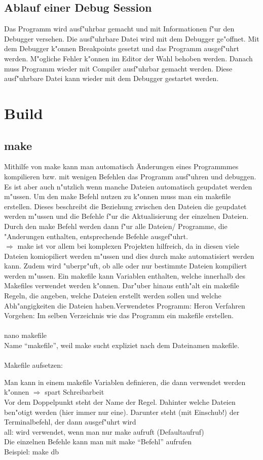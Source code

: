 \documentclass[a4paper,11pt,titlepage]{article}
\begin{document}
\subsection{Ablauf einer Debug Session}
Das Programm wird ausf"uhrbar gemacht und mit Informationen f"ur den Debugger versehen. Die ausf"uhrbare Datei wird mit dem Debugger ge"offnet. Mit dem Debugger k"onnen Breakpoints gesetzt und das Programm ausgef"uhrt werden. M"ogliche Fehler k"onnen im Editor der Wahl behoben werden. Danach muss Programm wieder mit Compiler ausf"uhrbar gemacht werden. Diese ausf"uhrbare Datei kann wieder mit dem Debugger gestartet werden.

\section{Build}
\subsection{make}
Mithilfe von make kann man automatisch Änderungen eines Programmmes kompilieren bzw. mit wenigen Befehlen das Programm ausf"uhren und debuggen. Es ist aber auch n"utzlich wenn manche Dateien automatisch geupdatet werden m"ussen. Um den make Befehl nutzen zu k"onnen muss man ein makefile erstellen. Dieses beschreibt die Beziehung zwischen den Dateien die geupdatet werden m"ussen und die Befehle f"ur die Aktualisierung der einzelnen Dateien. Durch den make Befehl werden dann f"ur alle Dateien/ Programme, die "Anderungen enthalten, entsprechende Befehle ausgef"uhrt.\\
$\Rightarrow$ make ist vor allem bei komplexen Projekten hilfreich, da in diesen viele Dateien komiopiliert werden m"ussen und dies durch make automatisiert werden kann. Zudem wird "uberpr"uft, ob alle oder nur bestimmte Dateien kompiliert werden m"ussen.
Ein makefile kann Variablen enthalten, welche innerhalb des Makefiles verwendet werden k"onnen. Dar"uber hinaus enth"alt ein makefile Regeln, die angeben, welche Dateien erstellt werden sollen und welche Abh"angigkeiten die Dateien haben.\newpage \noindent Verwendetes Programm: Heron Verfahren\\
Vorgehen: Im selben Verzeichnis wie das Programm ein makefile erstellen.\\
\\
nano makefile\\
Name "`makefile"', weil make sucht expliziet nach dem Dateinamen makefile.\\
\\
Makefile aufsetzen:

Man kann in einem makefile Variablen definieren, die dann verwendet werden k"onnen $\Rightarrow$ spart Schreibarbeit\\
Vor dem Doppelpunkt steht der Name der Regel. Dahinter welche Dateien ben"otigt werden (hier immer nur eine). Darunter steht (mit Einschub!) der Terminalbefehl, der dann ausgef"uhrt wird\\
all: wird verwendet, wenn man nur make aufruft (Defaultaufruf)\\
Die einzelnen Befehle kann man mit make "`Befehl"' aufrufen\\
Beispiel: make db
\end{document}
